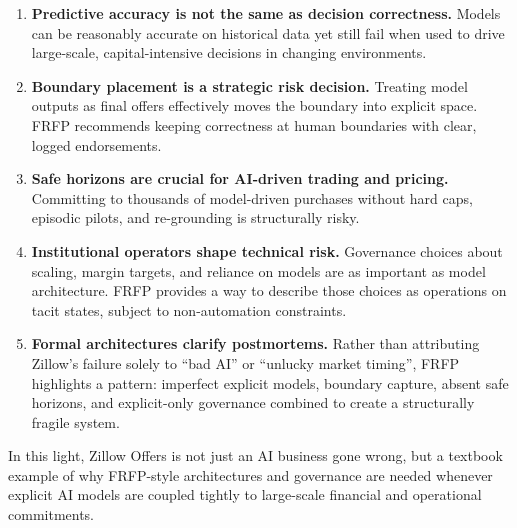 \begin{enumerate}
  \item \textbf{Predictive accuracy is not the same as decision correctness.}
        Models can be reasonably accurate on historical data yet still fail
        when used to drive large-scale, capital-intensive decisions in
        changing environments.

  \item \textbf{Boundary placement is a strategic risk decision.}
        Treating model outputs as final offers effectively moves the boundary
        into explicit space.
        FRFP recommends keeping correctness at human boundaries with clear,
        logged endorsements.

  \item \textbf{Safe horizons are crucial for AI-driven trading and pricing.}
        Committing to thousands of model-driven purchases without hard caps,
        episodic pilots, and re-grounding is structurally risky.

  \item \textbf{Institutional operators shape technical risk.}
        Governance choices about scaling, margin targets, and reliance on
        models are as important as model architecture.
        FRFP provides a way to describe those choices as operations on tacit
        states, subject to non-automation constraints.

  \item \textbf{Formal architectures clarify postmortems.}
        Rather than attributing Zillow’s failure solely to ``bad AI'' or
        ``unlucky market timing'', FRFP highlights a pattern:
        imperfect explicit models, boundary capture, absent safe horizons,
        and explicit-only governance combined to create a structurally
        fragile system.
\end{enumerate}

In this light, Zillow Offers is not just an AI business gone wrong, but a
textbook example of why FRFP-style architectures and governance are needed
whenever explicit AI models are coupled tightly to large-scale financial and
operational commitments.
